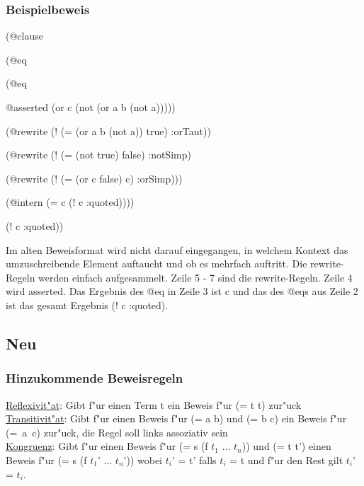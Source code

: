 \documentclass[a4paper]{article}
\begin{document}
\subsubsection{Beispielbeweis}


\begin{list}{\bf Zeile :}{\it}
\item (@clause
\item \hspace*{5mm}(@eq
\item \hspace*{10mm}(@eq
\item \hspace*{15mm}@asserted (or c (not (or a b (not a)))))
\item \hspace*{15mm}(@rewrite (! (= (or a b (not a)) true) :orTaut))
\item \hspace*{15mm}(@rewrite (! (= (not true) false) :notSimp)
\item \hspace*{15mm}(@rewrite (! (= (or c false) c) :orSimp)))
\item \hspace*{10mm}(@intern (= c (! c :quoted))))
\item \hspace*{5mm}(! c :quoted))
\end{list}

Im alten Beweisformat wird nicht darauf eingegangen,
in welchem Kontext das umzuschreibende Element auftaucht und ob es mehrfach auftritt.
Die rewrite-Regeln werden einfach aufgesammelt.
Zeile 5 - 7 sind die rewrite-Regeln. Zeile 4 wird asserted.
Das Ergebnis des @eq in Zeile 3 ist c und das des @eqs aus Zeile 2 ist das gesamt Ergebnis (! c :quoted).



\subsection{Neu}

\subsubsection{Hinzukommende Beweisregeln}
\uline{Reflexivit"at}: Gibt f"ur einen Term t ein Beweis f"ur (= t t) zur"uck\\
\uline{Transitivit"at}: Gibt f"ur einen Beweis f"ur (= a b) und (= b c) ein Beweis f"ur \mbox{(= a c)} zur"uck, die Regel soll links assoziativ sein\\
\uline{Kongruenz}: Gibt f"ur einen Beweis f"ur (= s (f $t_1$ ... $t_n$)) und (= t t') einen Beweis f"ur (= s (f $t_1$' ... $t_n$')) wobei $t_i$' = t' falls $t_i$ = t und f"ur den Rest gilt $t_i$' = $t_i$.\\
\end{document}
